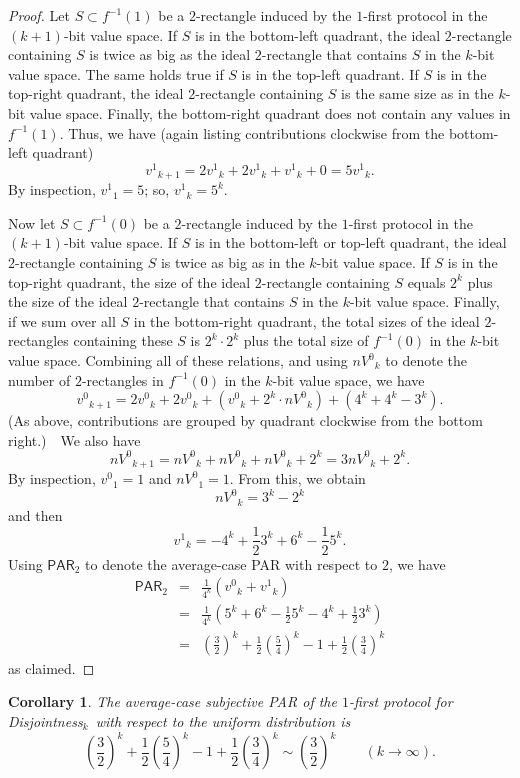 \documentclass{article}
\theoremstyle{theorem}
\newtheorem{cor}[theorem]{Corollary}
\theoremstyle{definition}
\theoremstyle{remark}
\newcommand{\PAR}{\ensuremath{\mathsf{PAR}}}
\newcommand{\disjoint}{{\sc Dis\-joint\-ness}\ensuremath{_k}}
\newcommand{\svn}{\ensuremath{v^0}}
\newcommand{\svy}{\ensuremath{v^1}}
\newcommand{\nv}{\ensuremath{nV^0}}
\begin{document}
\begin{proof}
Let $S\subset f^{-1}(1)$ be a $2$-rectangle induced by the $1$-first protocol in the $(k+1)$-bit value space.  If $S$ is in the bottom-left quadrant, the ideal $2$-rectangle containing $S$ is twice as big as the ideal $2$-rectangle that contains $S$ in the $k$-bit value space.  The same holds true if $S$ is in the top-left quadrant.  If $S$ is in the top-right quadrant, the ideal $2$-rectangle containing $S$ is the same size as in the $k$-bit value space.  Finally, the bottom-right quadrant does not contain any values in $f^{-1}(1)$.  Thus, we have (again listing contributions clockwise from the bottom-left quadrant)
\[
\svy_{k+1} = 2\svy_k + 2\svy_k + \svy_k + 0 = 5\svy_k.
\]
By inspection, $\svy_1 = 5$; so, $\svy_k = 5^k$.

Now let $S\subset f^{-1}(0)$ be a $2$-rectangle induced by the $1$-first protocol in the $(k+1)$-bit value space.  If $S$ is in the bottom-left or top-left quadrant, the ideal $2$-rectangle containing $S$ is twice as big as in the $k$-bit value space.  If $S$ is in the top-right quadrant, the size of the ideal $2$-rectangle containing $S$ equals $2^k$ plus the size of the ideal $2$-rectangle that contains $S$ in the $k$-bit value space.  Finally, if we sum over all $S$ in the bottom-right quadrant, the total sizes of the ideal $2$-rectangles containing these $S$ is $2^k\cdot 2^k$ plus the total size of $f^{-1}(0)$ in the $k$-bit value space.  Combining all of these relations, and using $\nv_k$ to denote the number of $2$-rectangles in $f^{-1}(0)$ in the $k$-bit value space, we have
\[
\svn_{k+1} = 2\svn_k + 2\svn_k + (\svn_k + 2^k\cdot \nv_k) + (4^k + 4^k-3^k).
\]
(As above, contributions are grouped by quadrant clockwise from the bottom right.)\ \ We also have
\[
\nv_{k+1} = \nv_k + \nv_k + \nv_k + 2^k = 3\nv_k + 2^k.
\]
By inspection, $\svn_1 = 1$ and $\nv_1=1$.  From this, we obtain
\[
\nv_k = 3^k - 2^k
\]
and then
\[
\svy_k = -4^k + \frac{1}{2}3^k + 6^k - \frac{1}{2}5^k.
\]
Using $\PAR_2$ to denote the average-case PAR with respect to $2$, we have
\begin{eqnarray*}
\PAR_2 &=& \frac{1}{4^k} (\svn_k + \svy_k)\\
    &=& \frac{1}{4^k} \left(5^k + 6^k - \frac{1}{2}5^k - 4^k + \frac{1}{2}3^k \right)\\
    &=& \left(\frac{3}{2}\right)^k + \frac{1}{2}\left(\frac{5}{4}\right)^k - 1 + \frac{1}{2}\left(\frac{3}{4}\right)^k
\end{eqnarray*}
as claimed.
\end{proof}

\begin{cor}
The average-case subjective PAR of the $1$-first protocol for \disjoint\ with respect to the uniform distribution is
\[
    \left(\frac{3}{2}\right)^k + \frac{1}{2}\left(\frac{5}{4}\right)^k - 1 + \frac{1}{2}\left(\frac{3}{4}\right)^k \sim \left(\frac{3}{2}\right)^k\qquad (k\rightarrow\infty).
\]
\end{cor}
\end{document}
